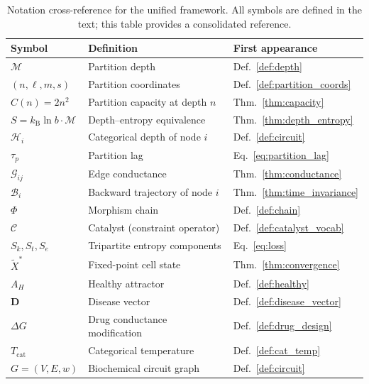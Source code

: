 \documentclass[twocolumn,10pt,a4paper]{article}
\theoremstyle{definition}
\theoremstyle{remark}
\newcommand{\kB}{k_{\mathrm{B}}}
\newcommand{\Depth}{\mathcal{M}}
\newcommand{\Hcat}{\mathcal{H}}
\newcommand{\taup}{\tau_p}
\newcommand{\Gcond}{\mathcal{G}}
\newcommand{\Back}{\mathcal{B}}
\newcommand{\morphism}{\Phi}
\newcommand{\catalyst}{\mathcal{C}}
\newcommand{\Sk}{S_k}
\newcommand{\St}{S_t}
\newcommand{\Se}{S_e}
\begin{document}
\begin{table}[t]
\centering
\caption{Notation cross-reference for the unified framework. All symbols are defined in the text; this table provides a consolidated reference.}
\label{tab:notation}
\begin{tabular}{@{}lll@{}}
\toprule
\textbf{Symbol} & \textbf{Definition} & \textbf{First appearance} \\
\midrule
$\Depth$ & Partition depth & Def.~\ref{def:depth} \\
$(n, \ell, m, s)$ & Partition coordinates & Def.~\ref{def:partition_coords} \\
$C(n) = 2n^2$ & Partition capacity at depth $n$ & Thm.~\ref{thm:capacity} \\
$S = \kB \ln b \cdot \Depth$ & Depth--entropy equivalence & Thm.~\ref{thm:depth_entropy} \\
$\Hcat_i$ & Categorical depth of node $i$ & Def.~\ref{def:circuit} \\
$\taup$ & Partition lag & Eq.~\ref{eq:partition_lag} \\
$\Gcond_{ij}$ & Edge conductance & Thm.~\ref{thm:conductance} \\
$\Back_i$ & Backward trajectory of node $i$ & Thm.~\ref{thm:time_invariance} \\
$\morphism$ & Morphism chain & Def.~\ref{def:chain} \\
$\catalyst$ & Catalyst (constraint operator) & Def.~\ref{def:catalyst_vocab} \\
$\Sk, \St, \Se$ & Tripartite entropy components & Eq.~\ref{eq:loss} \\
$\tilde{X}^*$ & Fixed-point cell state & Thm.~\ref{thm:convergence} \\
$A_H$ & Healthy attractor & Def.~\ref{def:healthy} \\
$\mathbf{D}$ & Disease vector & Def.~\ref{def:disease_vector} \\
$\Delta G$ & Drug conductance modification & Def.~\ref{def:drug_design} \\
$T_{\mathrm{cat}}$ & Categorical temperature & Def.~\ref{def:cat_temp} \\
$G = (V, E, w)$ & Biochemical circuit graph & Def.~\ref{def:circuit} \\
\bottomrule
\end{tabular}
\end{table}



\end{document}
